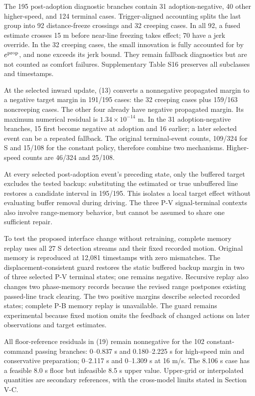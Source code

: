 \documentclass[letterpaper,journal]{IEEEtran}
\begin{document}
The 195 post-adoption diagnostic branches contain 31 adoption-negative, 40 other higher-speed, and 124 terminal cases. Trigger-aligned accounting splits the last group into 92 distance-freeze crossings and 32 creeping cases. In all 92, a fused estimate crosses 15 m before near-line freezing takes effect; 70 have a jerk override. In the 32 creeping cases, the small innovation is fully accounted for by \(e^{\rm prop}\), and none exceeds its jerk bound. They remain fallback diagnostics but are not counted as comfort failures. Supplementary Table S16 preserves all subclasses and timestamps.

At the selected inward update, (13) converts a nonnegative propagated margin to a negative target margin in 191/195 cases: the 32 creeping cases plus 159/163 noncreeping cases. The other four already have negative propagated margin. Its maximum numerical residual is \(1.34\times10^{-14}\) m. In the 31 adoption-negative branches, 15 first become negative at adoption and 16 earlier; a later selected event can be a repeated fallback. The original terminal-event counts, 109/324 for S and 15/108 for the constant policy, therefore combine two mechanisms. Higher-speed counts are 46/324 and 25/108.

At every selected post-adoption event's preceding state, only the buffered target excludes the tested backup: substituting the estimated or true unbuffered line restores a candidate interval in 195/195. This isolates a local target effect without evaluating buffer removal during driving. The three P-V signal-terminal contexts also involve range-memory behavior, but cannot be assumed to share one sufficient repair.

To test the proposed interface change without retraining, complete memory replay uses all 27 S detection streams and their fixed recorded motion. Original memory is reproduced at 12,081 timestamps with zero mismatches. The displacement-consistent guard restores the static buffered backup margin in two of three selected P-V terminal states; one remains negative. Recursive replay also changes two phase-memory records because the revised range postpones existing passed-line track clearing. The two positive margins describe selected recorded states; complete P-B memory replay is unavailable. The guard remains experimental because fixed motion omits the feedback of changed actions on later observations and target estimates.

All floor-reference residuals in (19) remain nonnegative for the 102 constant-command passing branches: 0--0.837 s and 0.180--2.225 s for high-speed min and conservative preparation; 0--2.117 s and 0--1.309 s at 16 m/s. The 8.106 s case has a feasible 8.0 s floor but infeasible 8.5 s upper value. Upper-grid or interpolated quantities are secondary references, with the cross-model limits stated in Section V-C.
\end{document}
